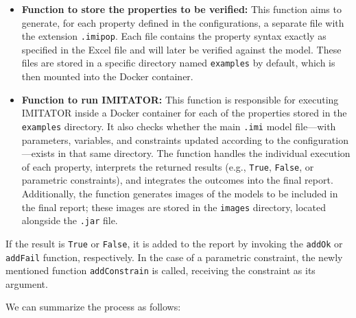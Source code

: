 \begin{itemize}
    \item \textbf{Function to store the properties to be verified:} This function aims to generate, for each property defined in the configurations, a separate file with the extension \texttt{.imipop}. Each file contains the property syntax exactly as specified in the Excel file and will later be verified against the model. These files are stored in a specific directory named \texttt{examples} by default, which is then mounted into the Docker container.

    \item \textbf{Function to run IMITATOR:} This function is responsible for executing IMITATOR inside a Docker container for each of the properties stored in the \texttt{examples} directory. It also checks whether the main \texttt{.imi} model file—with parameters, variables, and constraints updated according to the configuration—exists in that same directory. The function handles the individual execution of each property, interprets the returned results (e.g., \texttt{True}, \texttt{False}, or parametric constraints), and integrates the outcomes into the final report. Additionally, the function generates images of the models to be included in the final report; these images are stored in the \texttt{images} directory, located alongside the \texttt{.jar} file.
\end{itemize}

If the result is \texttt{True} or \texttt{False}, it is added to the report by invoking the \texttt{addOk} or \texttt{addFail} function, respectively. In the case of a parametric constraint, the newly mentioned function \texttt{addConstrain} is called, receiving the constraint as its argument.

We can summarize the process as follows:

